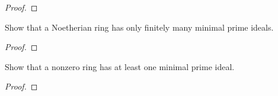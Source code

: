 \begin{proof}
\end{proof}
\newpage
\begin{problem}
Show that a Noetherian ring has only finitely many minimal prime
ideals.
\end{problem}
\begin{proof}
\end{proof}
\newpage
\begin{problem}
Show that a nonzero ring has at least one minimal prime ideal.
\end{problem}
\begin{proof}
\end{proof}

